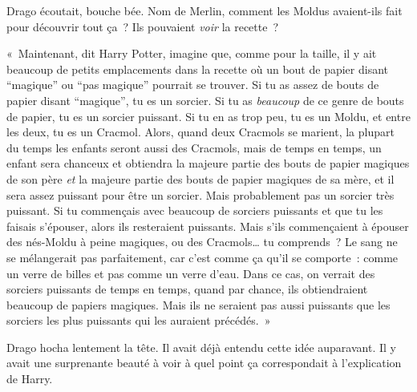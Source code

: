 Drago écoutait, bouche bée.
Nom de Merlin, comment les Moldus avaient-ils fait pour découvrir tout ça~?
Ils pouvaient \emph{voir} la recette~?

«~Maintenant, dit Harry Potter, imagine que, comme pour la taille, il y ait beaucoup de petits emplacements dans la recette où un bout de papier disant “magique” ou “pas magique” pourrait se trouver.
Si tu as assez de bouts de papier disant “magique”, tu es un sorcier.
Si tu as \emph{beaucoup} de ce genre de bouts de papier, tu es un sorcier puissant.
Si tu en as trop peu, tu es un Moldu, et entre les deux, tu es un Cracmol.
Alors, quand deux Cracmols se marient, la plupart du temps les enfants seront aussi des Cracmols, mais de temps en temps, un enfant sera chanceux et obtiendra la majeure partie des bouts de papier magiques de son père \emph{et} la majeure partie des bouts de papier magiques de sa mère, et il sera assez puissant pour être un sorcier.
Mais probablement pas un sorcier très puissant.
Si tu commençais avec beaucoup de sorciers puissants et que tu les faisais s'épouser, alors ils resteraient puissants.
Mais s'ils commençaient à épouser des nés-Moldu à peine magiques, ou des Cracmols… tu comprends~?
Le sang ne se mélangerait pas parfaitement, car c'est comme ça qu'il se comporte~: comme un verre de billes et pas comme un verre d'eau.
Dans ce cas, on verrait des sorciers puissants de temps en temps, quand par chance, ils obtiendraient beaucoup de papiers magiques.
Mais ils ne seraient pas aussi puissants que les sorciers les plus puissants qui les auraient précédés.~»

Drago hocha lentement la tête.
Il avait déjà entendu cette idée auparavant.
Il y avait une surprenante beauté à voir à quel point ça correspondait à l'explication de Harry.

